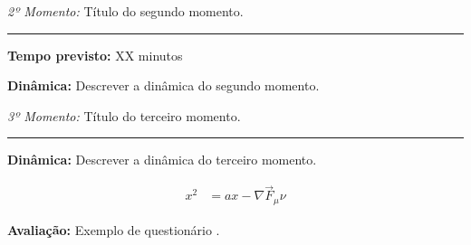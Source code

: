         \vspace{50pt}
        \noindent \emph{2º Momento:} Título do segundo momento.
        \par\noindent\rule{.3\textwidth}{.5pt}    
        \par\noindent \textbf{Tempo previsto: }XX minutos
        

        \noindent \textbf{Dinâmica:} Descrever a dinâmica do segundo momento.

        \vspace{50pt}
        \noindent \emph{3º Momento:} Título do terceiro momento.
        \par\noindent\rule{.3\textwidth}{.5pt}
        \par\noindent \textbf{Dinâmica:} Descrever a dinâmica do terceiro momento.      
            
        \begin{align}
            x^2&=ax-\nabla\vec{F}_\mu\nu
        \end{align}
        
        \par\noindent \textbf{Avaliação:} Exemplo de questionário \cite{CARVALHO:2012}.        
